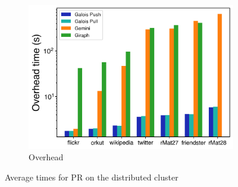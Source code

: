\documentclass{meetings}
\begin{document}
\begin{figure}
\begin{subfigure}{0.32\textwidth}
		\includegraphics[width=\linewidth]{../../plots/distributedPR_overheadTime.png}
		\caption{Overhead}
		\label{fig:distributedPR_overhead}
	\end{subfigure}
	\hfil
	\caption{Average times for PR on the distributed cluster}
	\label{fig:distributedPR}
\end{figure}

\clearpage
\end{document}
